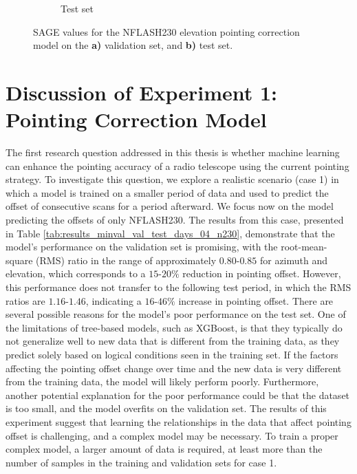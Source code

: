 \begin{figure}[H]
\begin{subfigure}[t]{0.92\textwidth}
       \caption{Test set}
       \label{subfig:sage_lastfold_nflash230_el_test}
    \end{subfigure}
    \caption[SAGE values for NFLASH230 elevation pointing correction model]{SAGE values for the NFLASH230 elevation pointing correction model on the \textbf{a)} validation set, and \textbf{b)} test set.}
    \label{fig:sage_lastfold_nflash230_el}
\end{figure}


\section{Discussion of Experiment 1: Pointing Correction Model}
The first research question addressed in this thesis is whether machine learning can enhance the pointing accuracy of a radio telescope using the current pointing strategy.
To investigate this question, we explore a realistic scenario (case 1) in which a model is trained on a smaller period of data and used to predict the offset of consecutive scans for a period afterward.
We focus now on the model predicting the offsets of only NFLASH230.
The results from this case, presented in Table \ref{tab:results_minval_val_test_days_04_n230}, demonstrate that the model's performance on the validation set is promising,
with the root-mean-square (RMS) ratio in the range of approximately $0.80$-$0.85$ for azimuth and elevation,
which corresponds to a $15$-$20\%$ reduction in pointing offset.
However, this performance does not transfer to the following test period,
in which the RMS ratios are $1.16$-$1.46$, indicating a $16$-$46\%$ increase in pointing offset.
There are several possible reasons for the model's poor performance on the test set.
One of the limitations of tree-based models, such as XGBoost, is that they typically do not generalize well to new data that is different from the training data,
as they predict solely based on logical conditions seen in the training set.
If the factors affecting the pointing offset change over time and the new data is very different from the training data, the model will likely perform poorly. 
Furthermore, another potential explanation for the poor performance could be that the dataset is too small, and the model overfits on the validation set.
The results of this experiment suggest that learning the relationships in the data that affect pointing offset is challenging, and a complex model may be necessary.
To train a proper complex model, a larger amount of data is required, at least more than the number of samples in the training and validation sets for case 1.
